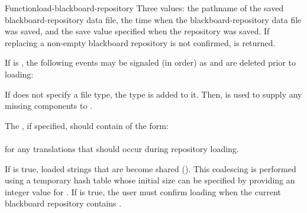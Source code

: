 \documentclass[10pt,twoside,english,pdftex]{article}
\begin{document}
\begin{functiondoc}{Function}{load-blackboard-repository}
\fnreturns Three values: the pathname of the saved blackboard-repository data
file, the time when the blackboard-repository data file was saved, and the
save value specified when the repository was saved. If replacing a non-empty
blackboard repository is not confirmed, \nil{} is returned.

\fnevents
{}%
%
%
%
%
%
%
%
%
%
%
%
If  is \nil, the following events may be signaled (in
order) as  and  are deleted prior
to loading:
\begin{tightitemize}
\item {}
\item {}
\item {}
\item {}
\end{tightitemize}

\fndescription If  does not specify a file type, the type
 is added to it.  Then,  is used
to supply any missing components to .

The  , if
specified, should contain  of the form:\\
%
~~~~~~~~\\
%
for any  translations that should occur during repository
loading.

If  is true, loaded strings that are
 become shared ().  This coalescing is performed
using a temporary hash table whose initial size can be specified by providing
an integer value for .  If
 is true, the user must confirm loading
when the current blackboard repository contains .


\end{functiondoc}
\end{document}
